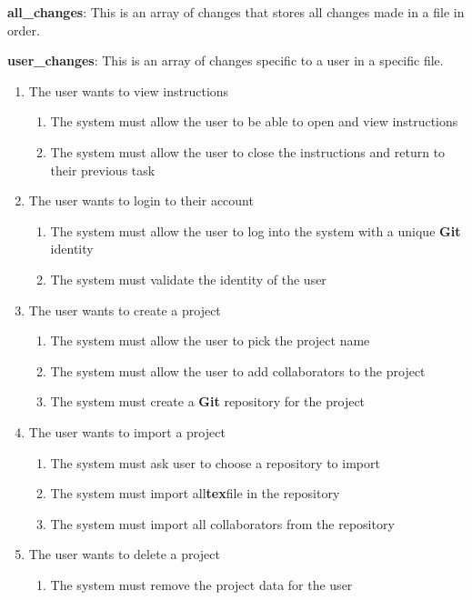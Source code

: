 \documentclass[12pt, titlepage]{article}
\begin{document}
	\noindent \textbf{all\_changes}: This is an array of changes that stores all changes made in a file in order.
	
	\noindent \textbf{user\_changes}: This is an array of changes specific to a user in a specific file.\\
	
	\begin{enumerate}[{BE}1.]
		\item The user wants to view instructions
		\begin{enumerate}[{FR}1.]
			\item The system must allow the user to be able to open and view instructions
			\item The system must allow the user to close the instructions and return to their previous task
		\end{enumerate}
		\item The user wants to login to their account
		\begin{enumerate}[resume*]
			\item The system must allow the user to log into the system with a unique \textbf{Git} identity
			\item The system must validate the identity of the user
		\end{enumerate}
		\item The user wants to create a project 
		\begin{enumerate}[resume*]
			\item The system must allow the user to pick the project name
			\item The system must allow the user to add collaborators to the project
			\item The system must create a \textbf{Git} repository for the project
		\end{enumerate}
		\item The user wants to import a project
		\begin{enumerate}[resume*]
			\item The system must ask user to choose a repository to import
			\item The system must import all\textbf{tex}file in the repository
			\item The system must import all collaborators from the repository
		\end{enumerate}
		\item The user wants to delete a project
		\begin{enumerate}[resume*]
			\item The system must remove the project data for the user

\end{enumerate}
\end{enumerate}
\end{document}
